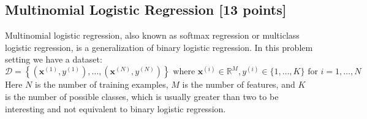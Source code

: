 \documentclass[11pt]{exam}
\numberwithin{equation}{section} %
\numberwithin{figure}{section} %
\numberwithin{table}{section} %
\newcommand{\Rb}{\mathbb{R}}
\newcommand{\xv}{\mathbf{x}}
\begin{document}
\subsection{Multinomial Logistic Regression [13 points]}
Multinomial logistic regression, also known as softmax regression or multiclass logistic regression, is a generalization of binary logistic regression. In this problem setting we have a dataset:
\[
\mathcal{D} = \left\{\left(\xv^{(1)}, y^{(1)}\right), \ldots, \left(\xv^{(N)}, y^{(N)}\right)\right\} \text{ where } \xv^{(i)} \in \Rb^M, y^{(i)} \in \{1, \ldots, K\} \text{ for } i = 1, \ldots, N
\]
Here $N$ is the number of training examples, $M$ is the number of features, and $K$ is the number of possible classes, which is usually greater than two to be interesting and not equivalent to binary logistic regression.
\end{document}
